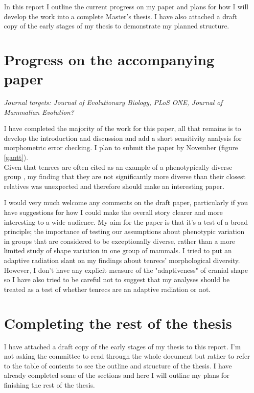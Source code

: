 \documentclass[12pt,a4paper]{article}
\begin{document}
	In this report I outline the current progress on my paper and plans for how I will develop the work into a complete Master's thesis. I have also attached a draft copy of the early stages of my thesis to demonstrate my planned structure.   


\section{Progress on the accompanying paper}

	\textit{Journal targets: Journal of Evolutionary Biology, PLoS ONE, Journal of Mammalian Evolution?} 
\bigskip

	I have completed the majority of the work for this paper, all that remains is to develop the introduction and discussion and add a short sensitivity analysis for morphometric error checking. I plan to submit the paper by November (figure \ref{gantt}). \\
	Given that tenrecs are often cited as an example of a phenotypically diverse group \citep[e.g.][]{Olson2013}, my finding that they are not significantly more diverse than their closest relatives was unexpected and therefore should make an interesting paper.

	I would very much welcome any comments on the draft paper, particularly if you have suggestions for how I could make the overall story clearer and more interesting to a wide audience. My aim for the paper is that it's a test of a broad principle; the importance of testing our assumptions about phenotypic variation in groups that are considered to be exceptionally diverse, rather than a more limited study of shape variation in one group of mammals. I tried to put an adaptive radiation slant on my findings about tenrecs' morphological diversity. However, I don't have any explicit measure of the "adaptiveness" of cranial shape so I have also tried to be careful not to suggest that my analyses should be treated as a test of whether tenrecs are an adaptive radiation or not.




\section{Completing the rest of the thesis}

	I have attached a draft copy of the early stages of my thesis to this report. I'm not asking the committee to read through the whole document but rather to refer to the table of contents to see the outline and structure of the thesis. I have already completed some of the sections and here I will outline my plans for finishing the rest of the thesis.
\end{document}
